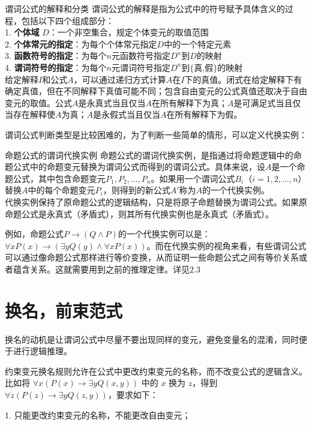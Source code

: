 \begin{definition}{谓词公式的解释和分类}{}
谓词公式的解释是指为公式中的符号赋予具体含义的过程，包括以下四个组成部分：\\
1. \textbf{个体域} $D$：一个非空集合，规定个体变元的取值范围\\
2. \textbf{个体常元的指定}：为每个个体常元指定$D$中的一个特定元素\\
3. \textbf{函数符号的指定}：为每个$n$元函数符号指定$D^n$到$D$的映射\\
4. \textbf{谓词符号的指定}：为每个$n$元谓词符号指定$D^n$到$\{\text{真,假}\}$的映射\\
给定解释$I$和公式$A$，可以通过递归方式计算$A$在$I$下的真值。闭式在给定解释下有确定真值，但在不同解释下真值可能不同；包含自由变元的公式真值还取决于自由变元的取值。公式$A$是永真式当且仅当$A$在所有解释下为真；$A$是可满足式当且仅当存在解释使$A$为真；$A$是永假式当且仅当$A$在所有解释下为假。
\end{definition}
谓词公式判断类型是比较困难的，为了判断一些简单的情形，可以定义代换实例：
\begin{definition}{命题公式的谓词代换实例}{}
命题公式的谓词代换实例，是指通过将命题逻辑中的命题公式中的命题变元替换为谓词公式而得到的谓词公式。具体来说，设$A$是一个命题公式，其中包含命题变元$P_1, P_2, \ldots, P_n$。如果用一个谓词公式$B_i$（$i = 1, 2, \ldots, n$）替换$A$中的每个命题变元$P_i$，则得到的新公式$A'$称为$A$的一个代换实例。\\
代换实例保持了原命题公式的逻辑结构，只是将原子命题替换为谓词公式。如果原命题公式是永真式（矛盾式），则其所有代换实例也是永真式（矛盾式）。
\end{definition}
例如，命题公式$P \rightarrow (Q \land P)$的一个代换实例可以是：$\forall x P(x) \rightarrow (\exists y Q(y) \land \forall x P(x))$。而在代换实例的视角来看，有些谓词公式可以通过像命题公式那样进行等价变换，从而证明一些命题公式之间有等价关系或者蕴含关系。这就需要用到之前的推理定律。详见$2.3$
\section{换名，前束范式}
换名的动机是让谓词公式中尽量不要出现同样的变元，避免变量名的混淆，同时便于进行逻辑推理。

约束变元换名规则允许在公式中更改约束变元的名称，而不改变公式的逻辑含义。比如将 $\forall x (P(x) \rightarrow \exists y Q(x,y))$ 中的 $x$ 换为 $z$，得到 $\forall z (P(z) \rightarrow \exists y Q(z,y))$，要求如下：

1. 只能更改约束变元的名称，不能更改自由变元；

